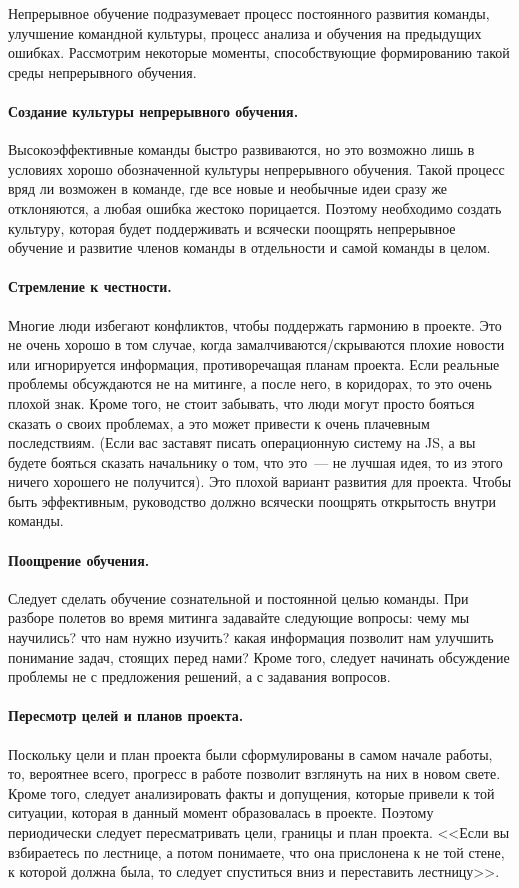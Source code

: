 \documentclass{../../text-style}
\begin{document}
Непрерывное обучение подразумевает процесс постоянного развития команды, улучшение командной культуры, процесс анализа и обучения на предыдущих ошибках. Рассмотрим некоторые моменты, способствующие формированию такой среды непрерывного обучения.

\paragraph*{Создание культуры непрерывного обучения.} Высокоэффективные команды быстро развиваются, но это возможно лишь в условиях хорошо обозначенной культуры непрерывного обучения. Такой процесс вряд ли возможен в команде, где все новые и необычные идеи сразу же отклоняются, а любая ошибка жестоко порицается. Поэтому необходимо создать культуру, которая будет поддерживать и всячески поощрять непрерывное обучение и развитие членов команды в отдельности и самой команды в целом.

\paragraph*{Стремление к честности.} Многие люди избегают конфликтов, чтобы поддержать гармонию в проекте. Это не очень хорошо в том случае, когда замалчиваются/скрываются плохие новости или игнорируется информация, противоречащая планам проекта. Если реальные проблемы обсуждаются не на митинге, а после него, в коридорах, то это очень плохой знак. Кроме того, не стоит забывать, что люди могут просто бояться сказать о своих проблемах, а это может привести к очень плачевным последствиям. (Если вас заставят писать операционную систему на JS, а вы будете бояться сказать начальнику о том, что это~--- не лучшая идея, то из этого ничего хорошего не получится). Это плохой вариант развития для проекта. Чтобы быть эффективным, руководство должно всячески поощрять открытость внутри команды.

\paragraph*{Поощрение обучения.} Следует сделать обучение сознательной и постоянной целью команды. При разборе полетов во время митинга задавайте следующие вопросы: чему мы научились? что нам нужно изучить? какая информация позволит нам улучшить понимание задач, стоящих перед нами? Кроме того, следует начинать обсуждение проблемы не с предложения решений, а с задавания вопросов.

\paragraph*{Пересмотр целей и планов проекта.} Поскольку цели и план проекта были сформулированы в самом начале работы, то, вероятнее всего, прогресс в работе позволит взглянуть на них в новом свете. Кроме того, следует анализировать факты и допущения, которые привели к той ситуации, которая в данный момент образовалась в проекте. Поэтому периодически следует пересматривать цели, границы и план проекта. <<Если вы взбираетесь по лестнице, а потом понимаете, что она прислонена к не той стене, к которой должна была, то следует спуститься вниз и переставить лестницу>>.
\end{document}
